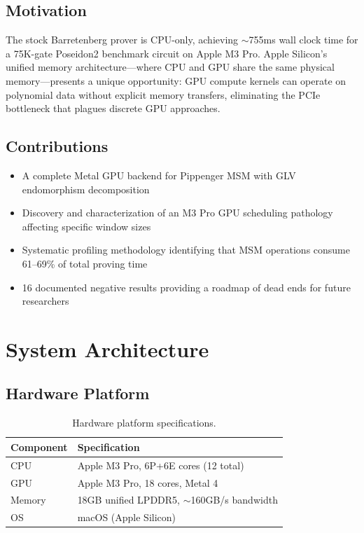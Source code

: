 \documentclass[11pt,a4paper]{article}
\begin{document}
\subsection{Motivation}

The stock Barretenberg prover is CPU-only, achieving $\sim$755ms wall clock time for a 75K-gate Poseidon2 benchmark circuit on Apple M3 Pro. Apple Silicon's unified memory architecture---where CPU and GPU share the same physical memory---presents a unique opportunity: GPU compute kernels can operate on polynomial data without explicit memory transfers, eliminating the PCIe bottleneck that plagues discrete GPU approaches.

\subsection{Contributions}

\begin{itemize}
    \item A complete Metal GPU backend for Pippenger MSM with GLV endomorphism decomposition
    \item Discovery and characterization of an M3 Pro GPU scheduling pathology affecting specific window sizes
    \item Systematic profiling methodology identifying that MSM operations consume 61--69\% of total proving time
    \item 16 documented negative results providing a roadmap of dead ends for future researchers
\end{itemize}

\section{System Architecture}

\subsection{Hardware Platform}

\begin{table}[H]
\centering
\begin{tabular}{ll}
\toprule
\textbf{Component} & \textbf{Specification} \\
\midrule
CPU & Apple M3 Pro, 6P+6E cores (12 total) \\
GPU & Apple M3 Pro, 18 cores, Metal 4 \\
Memory & 18GB unified LPDDR5, $\sim$160GB/s bandwidth \\
OS & macOS (Apple Silicon) \\
\bottomrule
\end{tabular}
\caption{Hardware platform specifications.}
\end{table}
\end{document}
